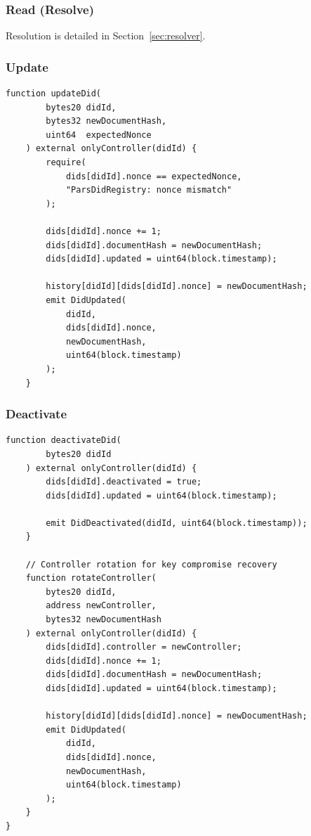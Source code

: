 \documentclass[11pt,a4paper]{article}
\begin{document}
\subsubsection{Read (Resolve)}

Resolution is detailed in Section~\ref{sec:resolver}.

\subsubsection{Update}

\begin{lstlisting}[language=Solidity,caption={DID Registry contract (Update)}]
    function updateDid(
        bytes20 didId,
        bytes32 newDocumentHash,
        uint64  expectedNonce
    ) external onlyController(didId) {
        require(
            dids[didId].nonce == expectedNonce,
            "ParsDidRegistry: nonce mismatch"
        );

        dids[didId].nonce += 1;
        dids[didId].documentHash = newDocumentHash;
        dids[didId].updated = uint64(block.timestamp);

        history[didId][dids[didId].nonce] = newDocumentHash;
        emit DidUpdated(
            didId,
            dids[didId].nonce,
            newDocumentHash,
            uint64(block.timestamp)
        );
    }
\end{lstlisting}

\subsubsection{Deactivate}

\begin{lstlisting}[language=Solidity,caption={DID Registry contract (Deactivate)}]
    function deactivateDid(
        bytes20 didId
    ) external onlyController(didId) {
        dids[didId].deactivated = true;
        dids[didId].updated = uint64(block.timestamp);

        emit DidDeactivated(didId, uint64(block.timestamp));
    }

    // Controller rotation for key compromise recovery
    function rotateController(
        bytes20 didId,
        address newController,
        bytes32 newDocumentHash
    ) external onlyController(didId) {
        dids[didId].controller = newController;
        dids[didId].nonce += 1;
        dids[didId].documentHash = newDocumentHash;
        dids[didId].updated = uint64(block.timestamp);

        history[didId][dids[didId].nonce] = newDocumentHash;
        emit DidUpdated(
            didId,
            dids[didId].nonce,
            newDocumentHash,
            uint64(block.timestamp)
        );
    }
}
\end{lstlisting}
\end{document}
